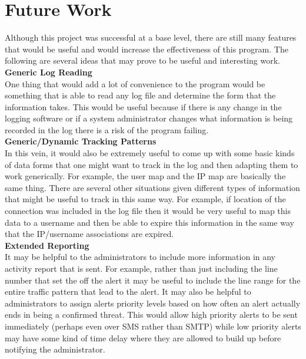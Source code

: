 \documentclass[12pt]{report}
\begin{document}
\section*{Future Work}
	Although this project was successful at a base level, there are still many 
	features that would be useful and would increase the effectiveness of this
	program. The following are several ideas that may prove to be useful and 
	interesting work. \\

	\noindent
	\textbf{Generic Log Reading} \\
	One thing that would add a lot of convenience to the program would 
	be something that is able to read any log file and determine the form that 
	the information takes. This would be useful because if there is any change 
	in the logging software or if a system administrator changes what information 
	is being recorded in the log there is a risk of the program failing. \\

	\noindent
	\textbf{Generic/Dynamic Tracking Patterns} \\
	In this vein, it would also be extremely useful to come up with some basic kinds of 
	data forms that one might want to track in the log and then adapting them to 
	work generically. For example, the user map and the IP map are basically the
	same thing. There are several other situations given different types of 
	information that might be useful to track in this same way. For example, if
	location of the connection was included in the log file then it would be very
	useful to map this data to a username and then be able to expire this information
	in the same way that the IP/username associations are expired. \\

	\noindent
	\textbf{Extended Reporting} \\
	It may be helpful to the administrators to include more information
	in any activity report that is sent. For example, rather than just including
	the line number that set the off the alert it may be useful to include the 
	line range for the entire traffic pattern that lead to the alert. It may also
	be helpful to administrators to assign alerts priority levels based on how 
	often an alert actually ends in being a confirmed threat. This would allow
	high priority alerts to be sent immediately (perhaps even over SMS rather than
	SMTP) while low priority alerts may have some kind of time delay where they
	are allowed to build up before notifying the administrator. \\
\end{document}
